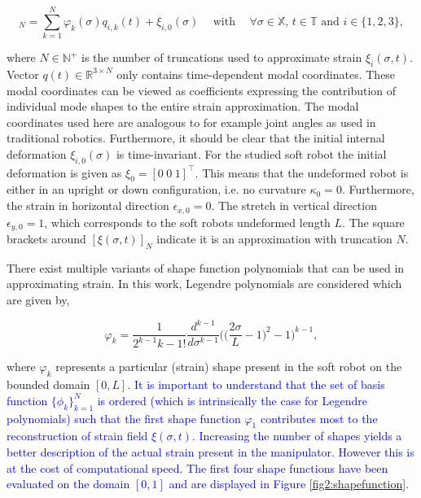 \begin{equation}
    [\xi_i(\sigma,t)]_N = \sum_{k=1}^N \varphi_k(\sigma)q_{i,k}(t) + \xi_{i,0}(\sigma) \hspace{15pt} \text{with} \hspace{15pt} \forall \sigma \in \mathbb{X}, \hspace{2pt} t \in \mathbb{T}  \hspace{4pt} \text{and} \hspace{4pt} i \in \{1,2,3\},
    \label{eq2:strainapprox}
\end{equation}

where $N \in \mathbb{N}^+$ is the number of truncations used to approximate strain $\xi_i(\sigma,t)$. Vector $q(t) \in \mathbb{R}^{3 \times N}$ only contains time-dependent modal coordinates. These modal coordinates can be viewed as coefficients expressing the contribution of individual mode shapes to the entire strain approximation. The modal coordinates used here are analogous to for example joint angles as used in traditional robotics. Furthermore, it should be clear that the initial internal deformation $\xi_{i,0}(\sigma)$ is time-invariant. For the studied soft robot the initial deformation is given as $\xi_0 = [0 \hspace{3pt} 0 \hspace{3pt} 1]^\top$. This means that the undeformed robot is either in an upright or down configuration, i.e. no curvature $\kappa_0 = 0$. Furthermore, the strain in horizontal direction $\epsilon_{x,0} = 0$. The stretch in vertical direction $\epsilon_{y,0} = 1$, which corresponds to the soft robots undeformed length $L$. The square brackets around $[\xi(\sigma,t)]_N$ indicate it is an approximation with truncation $N$. 

There exist multiple variants of shape function polynomials that can be used in approximating strain. In this work, Legendre polynomials are considered which are given by,

\begin{equation}
    \varphi_{k} = \frac{1}{2^{k-1} k-1!} \frac{d^{k-1}}{d\sigma^{k-1}}\Big(\Big(\frac{2\sigma}{L}-1\Big)^2-1\Big)^{k-1},
    \label{eq2:shapefunction}
\end{equation}

where $\varphi_k$ represents a particular (strain) shape present in the soft robot on the bounded domain $[0,L]$. \textcolor{blue}{It is important to understand that the set of basis function $\{\phi_k\}_{k=1}^N$ is ordered (which is intrinsically the case for Legendre polynomials) such that the first shape function $\varphi_1$ contributes most to the reconstruction of strain field $\xi(\sigma,t)$. Increasing the number of shapes yields a better description of the actual strain present in the manipulator. However this is at the cost of computational speed. The first four shape functions have been evaluated on the domain $[0,1]$ and are displayed in Figure \ref{fig2:shapefunction}.}

